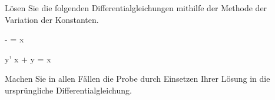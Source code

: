 \begin{atiTask}[
	title = Die Methode der Variation der Konstanten I,
	topic = Gewöhnliche Differentialgleichungen,
	subtopic = Lineare Differentialgleichungen 1. Ordnung,
	language = Deutsch,
]
	Lösen Sie die folgenden Differentialgleichungen mithilfe der Methode der Variation der Konstanten.
	\begin{atiSubequations}
		\item{
			- = \sin x
		}
		\item{
			y' \tan x + y = \sin x
		}
	\end{atiSubequations}
	Machen Sie in allen Fällen die Probe durch Einsetzen Ihrer Lösung in die ursprüngliche Differentialgleichung.
\end{atiTask}
